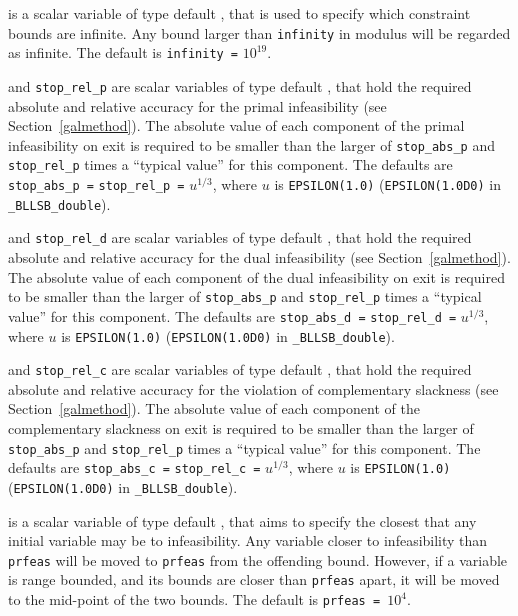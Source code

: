 \documentclass{galahad}
\newcommand{\packagename}{BLLSB}
\newcommand{\fullpackagename}{\libraryname\_\packagename}
\begin{document}
\begin{description}
 is a scalar variable of type default \realdp, that is used to
specify which constraint bounds are infinite.
Any bound larger than {\tt infinity} in modulus will be regarded as infinite.
The default is {\tt infinity =} $10^{19}$.

 and {\tt stop\_rel\_p}
are scalar variables of type default \realdp, that hold the
required absolute and relative accuracy for the primal infeasibility
(see Section~\ref{galmethod}).
The absolute value of each component of the primal infeasibility
on exit is required to be smaller than the larger of {\tt stop\_abs\_p} and
{\tt stop\_rel\_p} times a ``typical value'' for this component.
The defaults are {\tt stop\_abs\_p =} {\tt stop\_rel\_p =} $u^{1/3}$,
where $u$ is {\tt EPSILON(1.0)} ({\tt EPSILON(1.0D0)} in
{\tt \fullpackagename\_double}).

 and {\tt stop\_rel\_d}
are scalar variables of type default \realdp, that hold the
required absolute and relative accuracy for the dual infeasibility
(see Section~\ref{galmethod}).
The absolute value of each component of the dual infeasibility
on exit is required to be smaller than the larger of {\tt stop\_abs\_p} and
{\tt stop\_rel\_p} times a ``typical value'' for this component.
The defaults are {\tt stop\_abs\_d =} {\tt stop\_rel\_d =} $u^{1/3}$,
where $u$ is {\tt EPSILON(1.0)} ({\tt EPSILON(1.0D0)} in
{\tt \fullpackagename\_double}).

 and {\tt stop\_rel\_c}
are scalar variables of type default \realdp, that hold the
required absolute and relative accuracy
for the violation of complementary slackness
(see Section~\ref{galmethod}).
The absolute value of each component of the complementary slackness
on exit is required to be smaller than the larger of {\tt stop\_abs\_p} and
{\tt stop\_rel\_p} times a ``typical value'' for this component.
The defaults are {\tt stop\_abs\_c =} {\tt stop\_rel\_c =} $u^{1/3}$,
where $u$ is {\tt EPSILON(1.0)} ({\tt EPSILON(1.0D0)} in
{\tt \fullpackagename\_double}).

 is a scalar variable of type default \realdp, that aims to specify
the closest that any initial variable may be to infeasibility. Any variable
closer to infeasibility than {\tt prfeas} will be moved to {\tt prfeas} from
the offending bound. However, if a variable is range bounded, and its bounds
are closer than {\tt prfeas} apart, it will be moved to the mid-point of the
two bounds.
The default is {\tt prfeas = $10^4$}.


\end{description}
\end{document}
